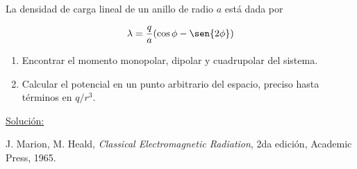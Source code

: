 \documentclass[a4paper,11pt]{article}
\numberwithin{equation}{section}
\begin{document}
La densidad de carga lineal de un anillo de radio $a$ está dada por 

$$
\lambda = \frac{q}{a}(\cos{\phi} - \sen{2\phi})
$$

\begin{enumerate}[label=\textbf{(\alph*)}]
\item Encontrar el momento monopolar, dipolar y cuadrupolar del sistema.
\item Calcular el potencial en un punto arbitrario del espacio, preciso hasta 
términos en $q/r^3$.
\end{enumerate}

\vspace{.3cm}

\underline{Solución:} \vspace{.3cm}

\begin{thebibliography}{10}
J. Marion, M. Heald, \emph{Classical Electromagnetic Radiation}, 2da edición, Academic 
Press, 1965.
\end{thebibliography}
\end{document}
